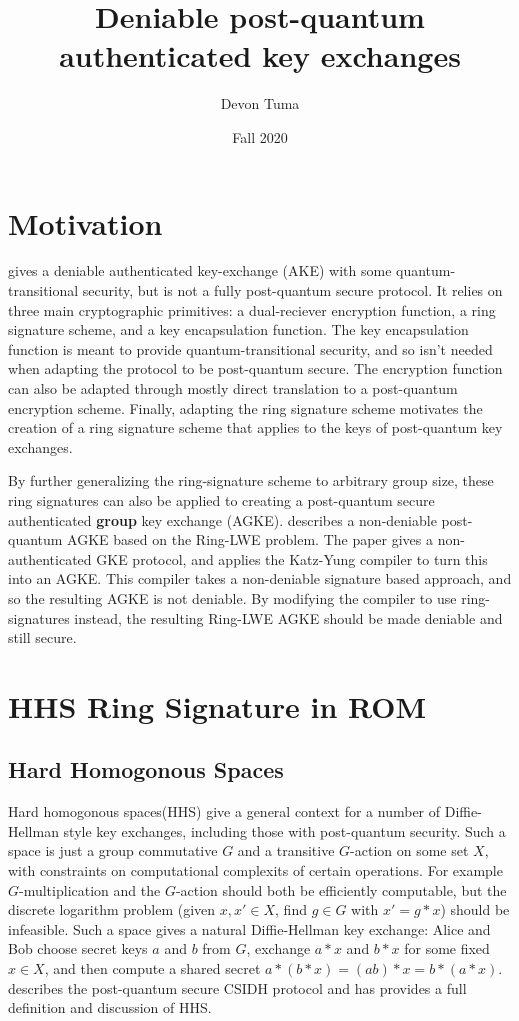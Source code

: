 \documentclass[11pt]{article}
\title{Deniable post-quantum authenticated key exchanges}
\author{Devon Tuma}
\date{Fall 2020}
\begin{document}
\maketitle


\section*{Motivation}

\cite{deniableAKE} gives a deniable authenticated key-exchange (AKE) with some quantum-transitional security, but is not a fully post-quantum secure protocol.
It relies on three main cryptographic primitives: a dual-reciever encryption function, a ring signature scheme, and a key encapsulation function.
The key encapsulation function is meant to provide quantum-transitional security, and so isn't needed when adapting the protocol to be post-quantum secure.
The encryption function can also be adapted through mostly direct translation to a post-quantum encryption scheme.
Finally, adapting the ring signature scheme motivates the creation of a ring signature scheme that applies to the keys of post-quantum key exchanges.

By further generalizing the ring-signature scheme to arbitrary group size, these ring signatures can also be applied to creating a post-quantum secure authenticated \textbf{group} key exchange (AGKE).
\cite{latticeAGKE} describes a non-deniable post-quantum AGKE based on the Ring-LWE problem.
The paper gives a non-authenticated GKE protocol, and applies the Katz-Yung compiler \cite{KYcompiler} to turn this into an AGKE.
This compiler takes a non-deniable signature based approach, and so the resulting AGKE is not deniable.
By modifying the compiler to use ring-signatures instead, the resulting Ring-LWE AGKE should be made deniable and still secure.

\section*{HHS Ring Signature in ROM}

\subsection*{Hard Homogonous Spaces}

Hard homogonous spaces(HHS) give a general context for a number of Diffie-Hellman style key exchanges, including those with post-quantum security.
Such a space is just a group commutative $G$ and a transitive $G$-action on some set $X$, with constraints on computational complexits of certain operations.
For example $G$-multiplication and the $G$-action should both be efficiently computable, but the discrete logarithm problem (given $x,x' \in X$, find $g \in G$ with $x' = g * x$) should be infeasible.
Such a space gives a natural Diffie-Hellman key exchange: Alice and Bob choose secret keys $a$ and $b$ from $G$, exchange $a * x$ and $b * x$ for some fixed $x \in X$, and then compute a shared secret $a * (b * x) = (ab) * x = b * (a * x)$.
\cite{CSIDH} describes the post-quantum secure CSIDH protocol and has provides a full definition and discussion of HHS.
\end{document}
